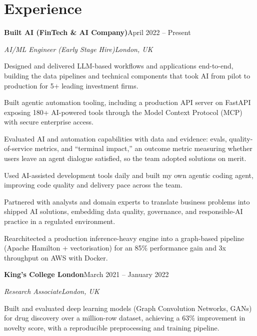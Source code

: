\documentclass[10pt,a4paper]{article}
\newcommand{\entry}[4]{%
  {\color{company}\bfseries #1}\hfill {\color{muted}#2}\par
  \vspace{1pt}
  {\itshape #3}\hfill {\color{muted}\itshape #4}\par
  \vspace{3pt}%
}
\begin{document}
\section{Experience}
\entry{Built AI (FinTech \& AI Company)}{April 2022 -- Present}{AI/ML Engineer (Early Stage Hire)}{London, UK}
\begin{tight}
  \item Designed and delivered LLM-based workflows and applications end-to-end, building the data pipelines and technical components that took AI from pilot to production for 5+ leading investment firms.
  \item Built agentic automation tooling, including a production API server on FastAPI exposing 180+ AI-powered tools through the Model Context Protocol (MCP) with secure enterprise access.
  \item Evaluated AI and automation capabilities with data and evidence: evals, quality-of-service metrics, and ``terminal impact,'' an outcome metric measuring whether users leave an agent dialogue satisfied, so the team adopted solutions on merit.
  \item Used AI-assisted development tools daily and built my own agentic coding agent, improving code quality and delivery pace across the team.
  \item Partnered with analysts and domain experts to translate business problems into shipped AI solutions, embedding data quality, governance, and responsible-AI practice in a regulated environment.
  \item Rearchitected a production inference-heavy engine into a graph-based pipeline (Apache Hamilton + vectorisation) for an 85\% performance gain and 3x throughput on AWS with Docker.
\end{tight}

\entry{King's College London}{March 2021 -- January 2022}{Research Associate}{London, UK}
\begin{tight}
  \item Built and evaluated deep learning models (Graph Convolution Networks, GANs) for drug discovery over a million-row dataset, achieving a 63\% improvement in novelty score, with a reproducible preprocessing and training pipeline.
\end{tight}

\end{document}
